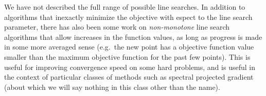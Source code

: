 \documentclass[12pt, leqno]{article} %
\begin{document}
We have not described the full range of possible line searches. In
addition to algorithms that inexactly minimize the objective with espect
to the line search parameter, there has also been some work on
\emph{non-monotone} line search algorithms that allow increases in the
function values, as long as progress is made in some more averaged sense
(e.g.~the new point has a objective function value smaller than the
maximum objective function for the past few points). This is useful for
improving convergence speed on some hard problems, and is useful in the
context of particular classes of methods such as spectral projected
gradient (about which we will say nothing in this class other than the
name).
\end{document}
